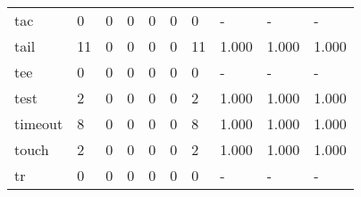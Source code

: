 \begin{longtable}{lp{1.3cm}p{1.3cm}p{1.3cm}p{1.3cm}p{1.3cm}p{1.3cm}p{1.3cm}p{1.3cm}p{1.3cm}}
tac       &                      0 &                                             0 &                                            0 &                                           0 &                                            0 &                                          0 &                                    - &                                      - &                                    - \\
tail      &                     11 &                                             0 &                                            0 &                                           0 &                                            0 &                                         11 &                                1.000 &                                  1.000 &                                1.000 \\
tee       &                      0 &                                             0 &                                            0 &                                           0 &                                            0 &                                          0 &                                    - &                                      - &                                    - \\
test      &                      2 &                                             0 &                                            0 &                                           0 &                                            0 &                                          2 &                                1.000 &                                  1.000 &                                1.000 \\
timeout   &                      8 &                                             0 &                                            0 &                                           0 &                                            0 &                                          8 &                                1.000 &                                  1.000 &                                1.000 \\
touch     &                      2 &                                             0 &                                            0 &                                           0 &                                            0 &                                          2 &                                1.000 &                                  1.000 &                                1.000 \\
tr        &                      0 &                                             0 &                                            0 &                                           0 &                                            0 &                                          0 &                                    - &                                      - &                                    - \\

\end{longtable}
